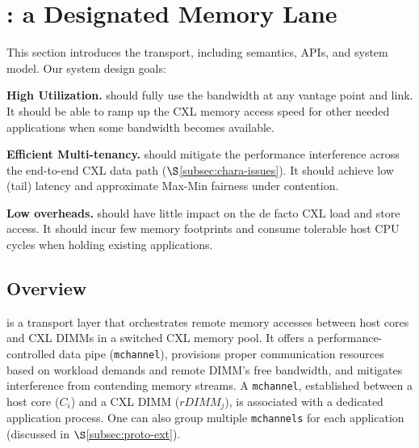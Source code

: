 \section{\sys: a Designated Memory Lane}
\label{sec:mchannel}

This section introduces the \sys transport, including semantics, APIs, and system model. Our system design goals:


\squishlist

    \item {\bf High Utilization.} \sys should fully use the bandwidth at any vantage point and link. It should be able to ramp up the CXL memory access speed for other needed applications when some bandwidth becomes available.

    \item {\bf Efficient Multi-tenancy.} \sys should mitigate the performance interference across the end-to-end CXL data path ($\S$\ref{subsec:chara-issues}). It should achieve low (tail) latency and approximate Max-Min fairness under contention.
        
    \item {\bf Low overheads.} \sys should have little impact on the de facto CXL load and store access. It should incur few memory footprints and consume tolerable host CPU cycles when holding existing applications.
    
\squishend

\subsection{Overview}
\label{subsec:mchannel-overview}

\sys is a transport layer that orchestrates remote memory accesses between host cores and CXL DIMMs in a switched CXL memory pool. It offers a performance-controlled data pipe (\texttt{mchannel}), provisions proper communication resources based on workload demands and remote DIMM's free bandwidth, and mitigates interference from contending memory streams. A \texttt{mchannel}, established between a host core ($C_i$) and a CXL DIMM ($rDIMM_j$), is associated with a dedicated application process. One can also group multiple \texttt{mchannels} for each application (discussed in $\S$\ref{subsec:proto-ext}).

